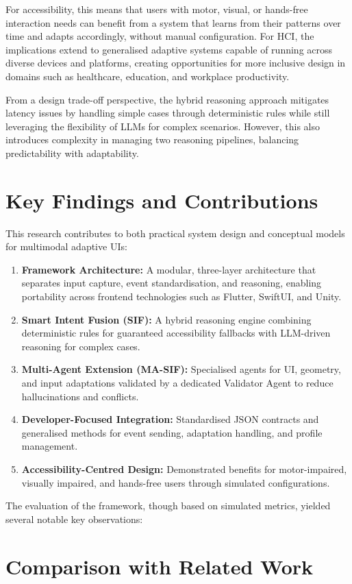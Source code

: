 \documentclass[openany]{book}
\begin{document}
For accessibility, this means that users with motor, visual, or hands-free interaction needs can benefit from a system that learns from their patterns over time and adapts accordingly, without manual configuration. For HCI, the implications extend to generalised adaptive systems capable of running across diverse devices and platforms, creating opportunities for more inclusive design in domains such as healthcare, education, and workplace productivity.

From a design trade-off perspective, the hybrid reasoning approach mitigates latency issues by handling simple cases through deterministic rules while still leveraging the flexibility of LLMs for complex scenarios. However, this also introduces complexity in managing two reasoning pipelines, balancing predictability with adaptability.

\section{Key Findings and Contributions}
This research contributes to both practical system design and conceptual models for multimodal adaptive UIs:
\begin{enumerate}
    \item \textbf{Framework Architecture:} A modular, three-layer architecture that separates input capture, event standardisation, and reasoning, enabling portability across frontend technologies such as Flutter, SwiftUI, and Unity.
    \item \textbf{Smart Intent Fusion (SIF):} A hybrid reasoning engine combining deterministic rules for guaranteed accessibility fallbacks with LLM-driven reasoning for complex cases.
    \item \textbf{Multi-Agent Extension (MA-SIF):} Specialised agents for UI, geometry, and input adaptations validated by a dedicated Validator Agent to reduce hallucinations and conflicts.
    \item \textbf{Developer-Focused Integration:} Standardised JSON contracts and generalised methods for event sending, adaptation handling, and profile management.
    \item \textbf{Accessibility-Centred Design:} Demonstrated benefits for motor-impaired, visually impaired, and hands-free users through simulated configurations.
\end{enumerate}
The evaluation of the framework, though based on simulated metrics, yielded several notable key observations:

\section{Comparison with Related Work}
\end{document}
